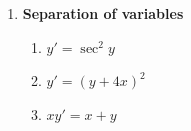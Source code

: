 \documentclass[letterpaper, fontsize=12pt]{scrartcl} %
\numberwithin{equation}{section} %
\numberwithin{figure}{section} %
\numberwithin{table}{section} %
\begin{document}
\begin{enumerate}


\item \textbf{Separation of variables}
\begin{enumerate}[label = (\alph*)]
\item $y ' = \sec^2 y$


\item $y' = (y + 4x)^2$


\item $xy' = x + y$



\end{enumerate}
\end{enumerate}
\end{document}
